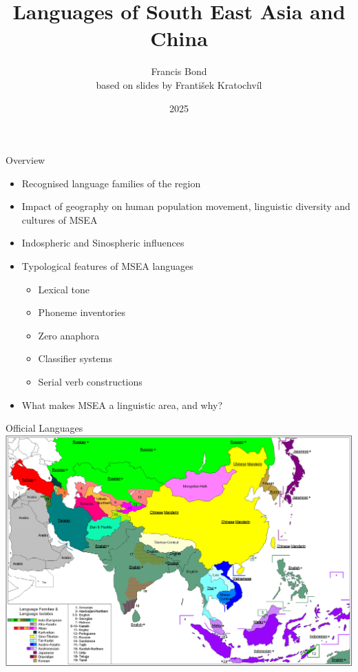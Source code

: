 \documentclass{beamer}
\title{Languages of South East Asia and China}
\author[Francis Bond]{Francis Bond \\ based on slides by František Kratochvíl}
\date{2025}
\begin{document}
\frame{\titlepage}

\begin{frame}{Overview}

\begin{itemize}
\item  Recognised language families of the region
\item Impact of geography on human population movement, linguistic diversity
and cultures of MSEA
\item Indospheric and Sinospheric influences

\item Typological features of MSEA languages
\begin{itemize}
\item Lexical tone
\item Phoneme inventories
\item Zero anaphora
\item Classifier systems
\item Serial verb constructions
\end{itemize}
\item What makes MSEA a linguistic area, and why?
\end{itemize}
\end{frame}

\begin{frame}{Official Languages}
\includegraphics[width=\textwidth]{pics/image1.png}
\end{frame}
\end{document}
